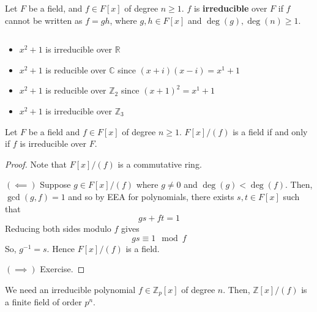 
\begin{defbox}
    \begin{definition}
        Let $ F $ be a field, and $ f\in F[x] $ of degree $ n\geqslant 1 $.
        $ f $ is \textbf{irreducible} over $ F $ if $ f $ cannot be written
        as $ f=gh $, where $ g,h\in F[x] $ and $ \deg(g),\deg(n)\geqslant 1 $.
    \end{definition}
\end{defbox}

\begin{exbox}
    \begin{example}[Irreducible] $ \; $
        \begin{itemize}
            \item $ x^2+1 $ is irreducible over $ \mathbb{R} $
            \item $ x^2+1 $ is reducible over $ \mathbb{C} $ since $ (x+i)(x-i)=x^1+1 $
            \item $ x^2+1 $ is reducible over $ \mathbb{Z}_2 $ since $ (x+1)^2=x^1+1 $
            \item $ x^2+1 $ is irreducible over $ \mathbb{Z}_3 $
        \end{itemize}
    \end{example}
\end{exbox}

\begin{thmbox}
    \begin{theorem}
        Let $ F $ be a field and $ f\in F[x] $ of degree $ n\geqslant 1 $.
        $ F[x]/(f) $ is a field if and only if $ f $ is irreducible over $ F $.
    \end{theorem}
\end{thmbox}

\begin{proof}
    Note that $ F[x]/(f) $ is a commutative ring.

    $ (\impliedby) $ Suppose $ g\in F[x]/(f) $ where $ g\neq 0 $
    and $ \deg(g)<\deg(f) $. Then, $ \gcd(g,f)=1 $ and so by EEA
    for polynomials, there exists $ s,t\in F[x] $ such that
    \[ gs+ft=1 \]
    Reducing both sides modulo $ f $ gives
    \[ gs\equiv 1 \mod f \]
    So, $ g^{-1}=s $. Hence $ F[x]/(f) $ is a field.

    $ (\implies) $ Exercise.
\end{proof}

We need an irreducible polynomial $ f\in\mathbb{Z}_p[x] $ of degree $ n $.
Then, $ \mathbb{Z}[x]/(f) $ is a finite field of order $ p^n $.

